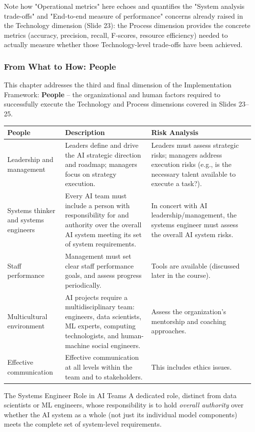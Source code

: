  Note how "Operational metrics" here echoes and quantifies the "System analysis trade-offs" and "End-to-end measure of performance" concerns already raised in the Technology dimension (Slide 23): the Process dimension provides the concrete metrics (accuracy, precision, recall, F-scores, resource efficiency) needed to actually measure whether those Technology-level trade-offs have been achieved.

\subsubsection{From What to How: People}

This  chapter  addresses the third and final dimension of the Implementation Framework: \textbf{People} -- the organizational and human factors required to successfully execute the Technology and Process dimensions covered in Slides 23--25.

\begin{center}
\begin{tabular}{p{3.2cm}p{4.6cm}p{4.4cm}}
\toprule
\textbf{People} & \textbf{Description} & \textbf{Risk Analysis} \\
\midrule
Leadership and management & Leaders define and drive the AI strategic direction and roadmap; managers focus on strategy execution. & Leaders must assess strategic risks; managers address execution risks (e.g., is the necessary talent available to execute a task?). \\[0.2cm]
Systems thinker and systems engineers & Every AI team must include a person with responsibility for and authority over the overall AI system meeting its set of system requirements. & In concert with AI leadership/management, the systems engineer must assess the overall AI system risks. \\[0.2cm]
Staff performance & Management must set clear staff performance goals, and assess progress periodically. & Tools are available (discussed later in the course). \\[0.2cm]
Multicultural environment & AI projects require a multidisciplinary team: engineers, data scientists, ML experts, computing technologists, and human-machine social engineers. & Assess the organization's mentorship and coaching approaches. \\[0.2cm]
Effective communication & Effective communication at all levels within the team and to stakeholders. & This includes ethics issues. \\
\bottomrule
\end{tabular}
\end{center}

\begin{defbox}{The Systems Engineer Role in AI Teams}
A dedicated role, distinct from data scientists or ML engineers, whose responsibility is to hold \emph{overall authority} over whether the AI system as a whole (not just its individual model components) meets the complete set of system-level requirements.
\end{defbox}
